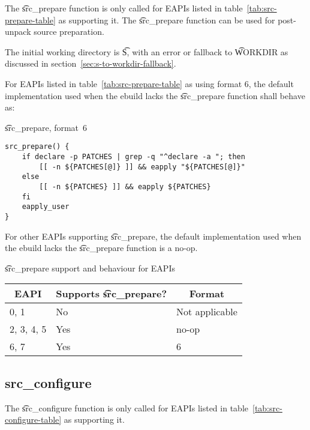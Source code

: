 The \t{src_prepare} function is only called for EAPIs listed in
table~\ref{tab:src-prepare-table} as supporting it. The \t{src_prepare} function can be used for
post-unpack source preparation.

The initial working directory is \t{S}, with an error or fallback to \t{WORKDIR} as discussed in
section~\ref{sec:s-to-workdir-fallback}.

 For EAPIs listed in table~\ref{tab:src-prepare-table} as using format
6, the default implementation used when the ebuild lacks the \t{src_prepare} function shall behave
as:

\begin{listing}[H]
\caption{\t{src_prepare}, format~6}
\begin{verbatim}
src_prepare() {
    if declare -p PATCHES | grep -q "^declare -a "; then
        [[ -n ${PATCHES[@]} ]] && eapply "${PATCHES[@]}"
    else
        [[ -n ${PATCHES} ]] && eapply ${PATCHES}
    fi
    eapply_user
}
\end{verbatim}
\end{listing}

For other EAPIs supporting \t{src_prepare}, the default implementation used when the ebuild lacks
the \t{src_prepare} function is a no-op.

\begin{centertable}{\t{src_prepare} support and behaviour for EAPIs}
    \label{tab:src-prepare-table}
    \begin{tabular}{lll}
      \toprule
      \multicolumn{1}{c}{\textbf{EAPI}} &
      \multicolumn{1}{c}{\textbf{Supports \t{src_prepare}?}} &
      \multicolumn{1}{c}{\textbf{Format}} \\
      \midrule
      0, 1              & No  & Not applicable \\
      2, 3, 4, 5        & Yes & no-op          \\
      6, 7              & Yes & 6              \\
      \bottomrule
    \end{tabular}
\end{centertable}

\subsection{src_configure}

 The \t{src_configure} function is only called for EAPIs listed in
table~\ref{tab:src-configure-table} as supporting it.

